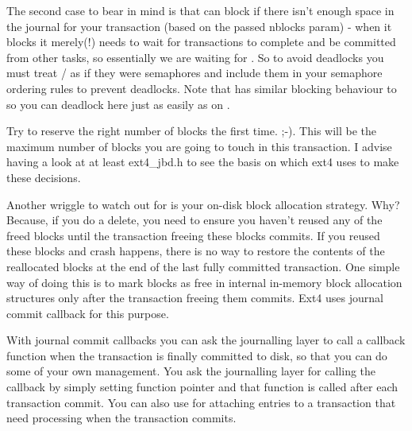 \documentclass[a4paper,8pt,english]{sphinxmanual}
\begin{document}
The second case to bear in mind is that {\hyperref[filesystems/index:c.jbd2_journal_start]{\emph{}}} can block
if there isn't enough space in the journal for your transaction (based
on the passed nblocks param) - when it blocks it merely(!) needs to wait
for transactions to complete and be committed from other tasks, so
essentially we are waiting for {\hyperref[filesystems/index:c.jbd2_journal_stop]{\emph{}}}. So to avoid
deadlocks you must treat {\hyperref[filesystems/index:c.jbd2_journal_start]{\emph{}}} /
{\hyperref[filesystems/index:c.jbd2_journal_stop]{\emph{}}} as if they were semaphores and include them in
your semaphore ordering rules to prevent
deadlocks. Note that {\hyperref[filesystems/index:c.jbd2_journal_extend]{\emph{}}} has similar blocking
behaviour to {\hyperref[filesystems/index:c.jbd2_journal_start]{\emph{}}} so you can deadlock here just as
easily as on {\hyperref[filesystems/index:c.jbd2_journal_start]{\emph{}}}.

Try to reserve the right number of blocks the first time. ;-). This will
be the maximum number of blocks you are going to touch in this
transaction. I advise having a look at at least ext4\_jbd.h to see the
basis on which ext4 uses to make these decisions.

Another wriggle to watch out for is your on-disk block allocation
strategy. Why? Because, if you do a delete, you need to ensure you
haven't reused any of the freed blocks until the transaction freeing
these blocks commits. If you reused these blocks and crash happens,
there is no way to restore the contents of the reallocated blocks at the
end of the last fully committed transaction. One simple way of doing
this is to mark blocks as free in internal in-memory block allocation
structures only after the transaction freeing them commits. Ext4 uses
journal commit callback for this purpose.

With journal commit callbacks you can ask the journalling layer to call
a callback function when the transaction is finally committed to disk,
so that you can do some of your own management. You ask the journalling
layer for calling the callback by simply setting
 function pointer and that function is
called after each transaction commit. You can also use
 for attaching entries to a transaction
that need processing when the transaction commits.
\end{document}
